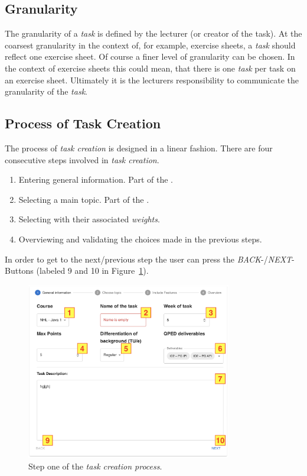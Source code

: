 \subsection{Granularity}
The granularity of a \textit{task} is defined by the lecturer (or creator of the task). At the coarsest granularity in the context of, for example, exercise sheets, a \textit{task} should reflect one exercise sheet. Of course a finer level of granularity can be chosen. In the context of exercise sheets this could mean, that there is one \textit{task} per task on an exercise sheet. Ultimately it is the lecturers responsibility to communicate the granularity of the \textit{task}.

\subsection{Process of Task Creation}
The process of \textit{task creation} is designed in a linear fashion. There are four consecutive steps involved in \textit{task creation}.

\begin{enumerate}
  \item Entering general information. Part of the .
  \item Selecting a main topic. Part of the .
  \item Selecting  with their associated \textit{weights}.
  \item Overviewing and validating the choices made in the previous steps. 
\end{enumerate}

In order to get to the next/previous step the user can press the \textit{BACK}-/\textit{NEXT}-Buttons (labeled 9 and 10 in Figure~\ref{fig:taskcreation1}).

\begin{figure}[h]
  \begin{center}
    \includegraphics[width=0.8\textwidth]{figures/taskcreation1}
  \end{center}
  \caption{Step one of the \textit{task creation process}.}
  \label{fig:taskcreation1}
\end{figure}

